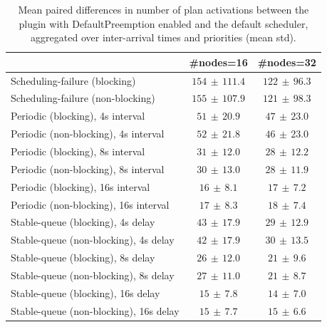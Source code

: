 \begin{table}[t]
\tiny
\setlength{\tabcolsep}{1.2pt}
\renewcommand{\arraystretch}{1.12}
\centering
\caption{Mean paired differences in number of plan activations between the plugin with DefaultPreemption enabled and the default scheduler, aggregated over inter-arrival times and priorities (mean \pm std).}
\label{tab:plan_activations-defpreempt1-std1-agg-arrival-prio}
\begin{tabular}{l c c}
\toprule
 & \#nodes=16 & \#nodes=32 \\
\midrule
Scheduling-failure (blocking) & $154\,\pm\,111.4$ & $122\,\pm\,96.3$ \\
Scheduling-failure (non-blocking) & $155\,\pm\,107.9$ & $121\,\pm\,98.3$ \\
Periodic (blocking), 4s interval & $51\,\pm\,20.9$ & $47\,\pm\,23.0$ \\
Periodic (non-blocking), 4s interval & $52\,\pm\,21.8$ & $46\,\pm\,23.0$ \\
Periodic (blocking), 8s interval & $31\,\pm\,12.0$ & $28\,\pm\,12.2$ \\
Periodic (non-blocking), 8s interval & $30\,\pm\,13.0$ & $28\,\pm\,11.9$ \\
Periodic (blocking), 16s interval & $16\,\pm\,8.1$ & $17\,\pm\,7.2$ \\
Periodic (non-blocking), 16s interval & $17\,\pm\,8.3$ & $18\,\pm\,7.4$ \\
Stable-queue (blocking), 4s delay & $43\,\pm\,17.9$ & $29\,\pm\,12.9$ \\
Stable-queue (non-blocking), 4s delay & $42\,\pm\,17.9$ & $30\,\pm\,13.5$ \\
Stable-queue (blocking), 8s delay & $26\,\pm\,12.0$ & $21\,\pm\,9.6$ \\
Stable-queue (non-blocking), 8s delay & $27\,\pm\,11.0$ & $21\,\pm\,8.7$ \\
Stable-queue (blocking), 16s delay & $15\,\pm\,7.8$ & $14\,\pm\,7.0$ \\
Stable-queue (non-blocking), 16s delay & $15\,\pm\,7.7$ & $15\,\pm\,6.6$ \\
\bottomrule
\end{tabular}
\end{table}
